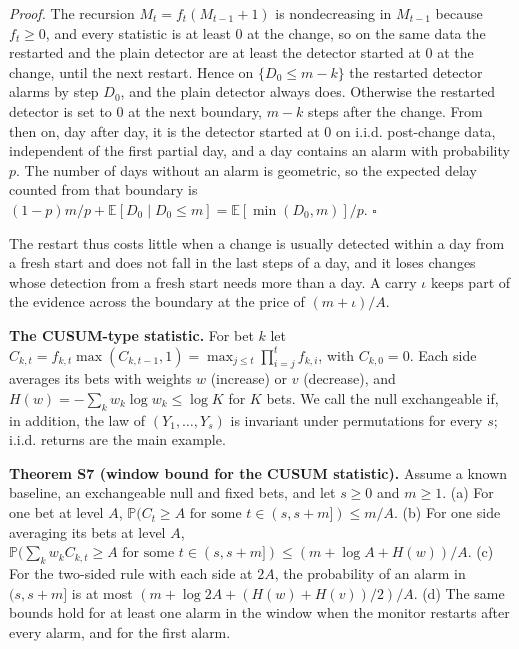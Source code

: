 \documentclass[
]{article}
\begin{document}
\emph{Proof.} The recursion \(M_t = f_t(M_{t-1} + 1)\) is nondecreasing
in \(M_{t-1}\) because \(f_t \ge 0\), and every statistic is at least 0
at the change, so on the same data the restarted and the plain detector
are at least the detector started at 0 at the change, until the next
restart. Hence on \(\lbrace D_0 \le m - k\rbrace\) the restarted
detector alarms by step \(D_0\), and the plain detector always does.
Otherwise the restarted detector is set to 0 at the next boundary,
\(m - k\) steps after the change. From then on, day after day, it is the
detector started at 0 on i.i.d. post-change data, independent of the
first partial day, and a day contains an alarm with probability \(p\).
The number of days without an alarm is geometric, so the expected delay
counted from that boundary is
\((1 - p)m/p + \mathbb{E}[D_0 \mid D_0 \le m] = \mathbb{E}[\min(D_0, m)]/p\).
\(\square\)

The restart thus costs little when a change is usually detected within a
day from a fresh start and does not fall in the last steps of a day, and
it loses changes whose detection from a fresh start needs more than a
day. A carry \(\iota\) keeps part of the evidence across the boundary at
the price of \((m + \iota)/A\).

\textbf{The CUSUM-type statistic.} For bet \(k\) let
\(C_{k,t} = f_{k,t}\max(C_{k,t-1}, 1) = \max_{j \le t}\prod_{i=j}^{t} f_{k,i}\),
with \(C_{k,0} = 0\). Each side averages its bets with weights \(w\)
(increase) or \(v\) (decrease), and
\(H(w) = -\sum_k w_k\log w_k \le \log K\) for \(K\) bets. We call the
null exchangeable if, in addition, the law of \((Y_1, \dots, Y_s)\) is
invariant under permutations for every \(s\); i.i.d. returns are the
main example.

\textbf{Theorem S7 (window bound for the CUSUM statistic).} Assume a
known baseline, an exchangeable null and fixed bets, and let \(s \ge 0\)
and \(m \ge 1\). (a) For one bet at level \(A\),
\(\mathbb{P}(C_t \ge A \text{ for some } t \in (s, s + m]) \le m/A\).
(b) For one side averaging its bets at level \(A\),
\(\mathbb{P}(\sum_k w_k C_{k,t} \ge A \text{ for some } t \in (s, s + m]) \le (m + \log A + H(w))/A\).
(c) For the two-sided rule with each side at \(2A\), the probability of
an alarm in \((s, s + m]\) is at most
\((m + \log 2A + (H(w) + H(v))/2)/A\). (d) The same bounds hold for at
least one alarm in the window when the monitor restarts after every
alarm, and for the first alarm.
\end{document}
